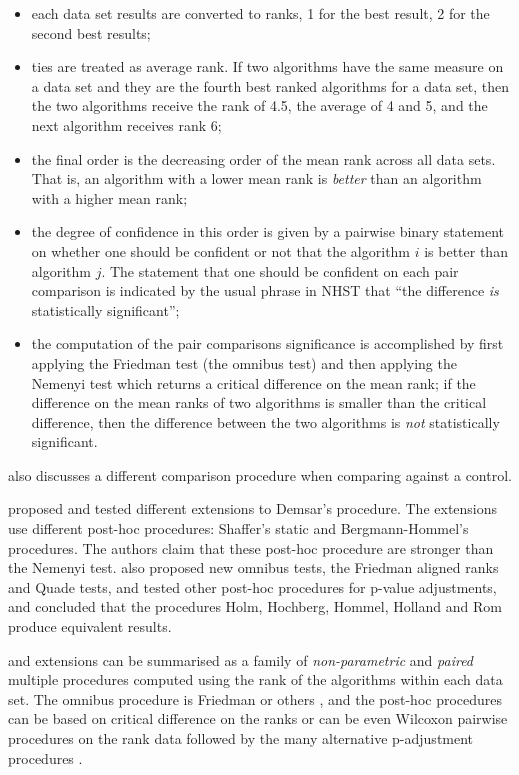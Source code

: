 \documentclass[twoside,11pt,preprint]{article}
\def\tightlist{}
\begin{document}
\begin{itemize}
\tightlist
\item
  each data set results are converted to ranks, 1 for the best
  result, 2 for the second best results;
\item
  ties are treated as average rank. If two algorithms have the same
  measure on a data set and they are the fourth best ranked
  algorithms for a data set, then the two algorithms receive the
  rank of 4.5, the average of 4 and 5, and the next algorithm receives rank 6;
\item
  the final order is the decreasing order of the mean rank across
  all data sets. That is, an algorithm with a lower mean rank is
  \emph{better} than an algorithm with a higher mean rank;
\item
  the degree of confidence in this order is given by a pairwise
  binary statement on whether one should be confident or not that
  the algorithm \(i\) is better than algorithm \(j\). The statement that
  one should be confident on each pair comparison is indicated by
  the usual phrase in NHST
  that ``the difference \emph{is} statistically significant'';
\item
  the computation of the pair comparisons significance is
  accomplished by first applying the Friedman test (the omnibus test) and then applying the Nemenyi
  test which returns a critical difference on the mean rank; if
  the difference on the mean ranks of two algorithms is smaller than
  the critical difference, then the difference between the two
  algorithms is \emph{not} statistically significant.
\end{itemize}

\citet{demsar} also
discusses a different comparison procedure when comparing against a
control.

\citet{garcia2008extension} proposed and tested different extensions to
Demsar's procedure. The extensions use different post-hoc procedures:
Shaffer's static and Bergmann-Hommel's procedures. The authors claim
that these post-hoc procedure are stronger than
the Nemenyi test. \citet{garcia2010advanced} also proposed new omnibus
tests, the Friedman aligned ranks and Quade tests, and tested other
post-hoc procedures for p-value adjustments, and concluded that the
procedures Holm, Hochberg, Hommel, Holland and Rom produce equivalent
results.

\citet{demsar} and extensions can be summarised as a family of \emph{non-parametric} and \emph{paired} multiple procedures computed using the rank of the algorithms within each data set. The omnibus procedure is Friedman \citep{demsar} or others \citep{garcia2010advanced}, and the post-hoc procedures can be based on critical difference on the ranks \citep{demsar, garcia2008extension} or can be even Wilcoxon pairwise procedures on the rank data followed by the many alternative p-adjustment procedures \citep{garcia2010advanced}.
\end{document}
